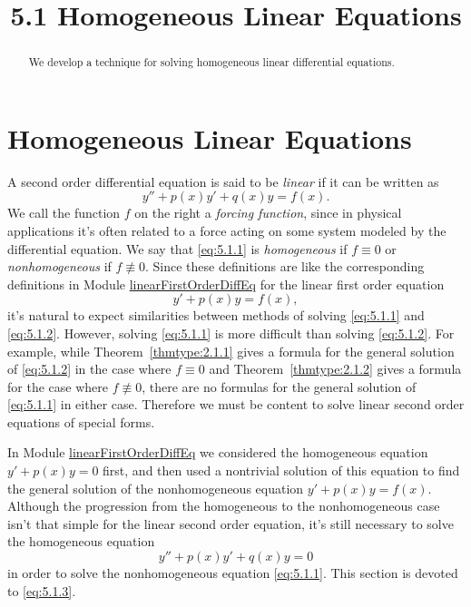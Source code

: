 \documentclass{ximera}
\title{5.1 Homogeneous Linear Equations}%
\begin{document}
 
\begin{abstract}
We develop a technique for solving homogeneous linear differential equations.
\end{abstract}
 
\maketitle
 
\section*{Homogeneous Linear Equations}
 
A second order differential equation is said to be \textit{linear} if
it can be written as
\begin{equation}\label{eq:5.1.1}
y''+p(x)y'+q(x)y=f(x).
\end{equation}
We call the function $f$ on the right a \textit{forcing function},
since in physical applications it's often related to a force acting
on some system modeled by the differential equation. We say that
\eqref{eq:5.1.1} is \textit{homogeneous} if $f\equiv0$ or \textit{nonhomogeneous} if $f\not\equiv0$. Since these definitions are like
the corresponding definitions in Module \href{https://ximera.osu.edu/ode/main/linearFirstOrderDiffEq/linearFirstOrderDiffEq}{linearFirstOrderDiffEq} for the linear
first order equation
\begin{equation}\label{eq:5.1.2}
y'+p(x)y=f(x),
\end{equation}
it's natural to expect similarities between methods of solving
\eqref{eq:5.1.1} and \eqref{eq:5.1.2}. However, solving \eqref{eq:5.1.1} is more
difficult than solving \eqref{eq:5.1.2}. For example, while
Theorem~\ref{thmtype:2.1.1} gives a formula for the general solution of
\eqref{eq:5.1.2} in the case where $f\equiv0$ and
Theorem~\ref{thmtype:2.1.2} gives
a formula for the case where $f\not\equiv0$, there are no formulas for
the general solution of \eqref{eq:5.1.1} in either case. Therefore we must
be content to solve linear second order equations of special forms.
 
In Module \href{https://ximera.osu.edu/ode/main/linearFirstOrderDiffEq/linearFirstOrderDiffEq}{linearFirstOrderDiffEq}
we considered the homogeneous equation
$y'+p(x)y=0$ first, and then used a nontrivial solution of this
equation to find the general solution of the nonhomogeneous equation
$y'+p(x)y=f(x)$. Although the progression from the homogeneous to the
nonhomogeneous case isn't  that simple for the linear second order
equation, it's still necessary to solve the homogeneous equation
\begin{equation}\label{eq:5.1.3}
y''+p(x)y'+q(x)y=0
\end{equation}
in order to solve the nonhomogeneous equation \eqref{eq:5.1.1}. This
section is devoted to \eqref{eq:5.1.3}.
 
\end{document}
